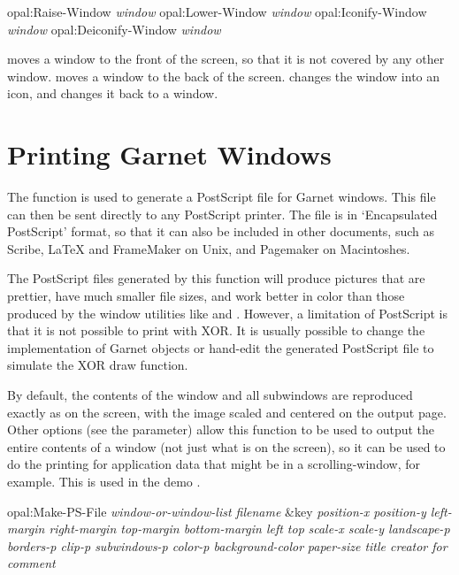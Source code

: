 \begin{programexample}
opal:Raise-Window {\it window}\value{function}
opal:Lower-Window {\it window}\value{function}
opal:Iconify-Window {\it window}\value{function}
opal:Deiconify-Window {\it window}\value{function}
\end{programexample}
 moves a window to the front of the screen, so that
it is not covered by any other window.   moves a
window to the back of the screen.   changes the
window into an icon, and  changes it back to a window.



\chapter{Printing Garnet Windows}
\label{printing}
  

The function  is used to generate a PostScript file for
Garnet windows.  This file can then be sent directly to any PostScript
printer.  The file is in `Encapsulated PostScript'
format, so that it can also be included in other documents, such as Scribe,
LaTeX and FrameMaker on Unix, and Pagemaker on Macintoshes.

The PostScript files generated by this function will produce pictures that
are prettier, have much smaller file sizes, and work better in color than
those produced by the window utilities like  and .  However,
a limitation of PostScript is that it is not possible to print with XOR.
It is usually possible to change the implementation of Garnet objects or
hand-edit the generated PostScript file to simulate the XOR draw function.

By default, the contents of the window and all subwindows are
reproduced exactly as on the screen, with the image scaled and
centered on the output page.  Other options (see the 
parameter) allow this function to be
used to output the entire contents of a window (not just what is on
the screen), so it can be used to do the printing for application data
that might be in a scrolling-window, for example.  This is used in the
demo .

\vspace{1 line}
\begin{programexample}
opal:Make-PS-File {\it window-or-window-list  filename}\value{function}
                  \&key {\it position-x  position-y  left-margin  right-margin  top-margin  bottom-margin  left  top}
                  {\it scale-x  scale-y  landscape-p  borders-p  clip-p  subwindows-p  color-p  background-color}
                  {\it paper-size  title  creator  for  comment}
\end{programexample}


